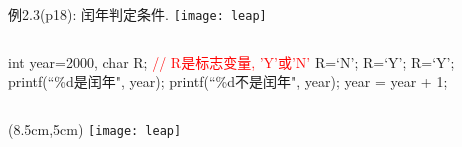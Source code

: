 \begin{frame}{例2.3(p18): 闰年判定条件.}
\centering
\texttt{[image: leap]}
\end{frame}


\begin{frame}[shrink]
\begin{columns}%
	\begin{column}{1.0\textwidth}
		\begin{algorithm}[H]  
			\caption{例2.3(p18): 判定2000—2500年中的每一年是否为闰年.} %
			\begin{algorithmic}[1] %
				\State int year=2000, char R; \textcolor{red}{// R是标志变量, 'Y'或'N'}
				\State R=`N';  
				 R=`Y'; %
				 R=`Y';
				\EndIf
				 printf(``\%d是闰年", year); 
				\Else \quad printf(``\%d不是闰年", year);
				\EndIf	
				\State year = year + 1;
				\EndWhile
			\end{algorithmic}  
		\end{algorithm}
	\end{column}%
\end{columns}
\begin{textblock*}{15cm}(8.5cm,5cm)
	\texttt{[image: leap]}
\end{textblock*}
\end{frame}

